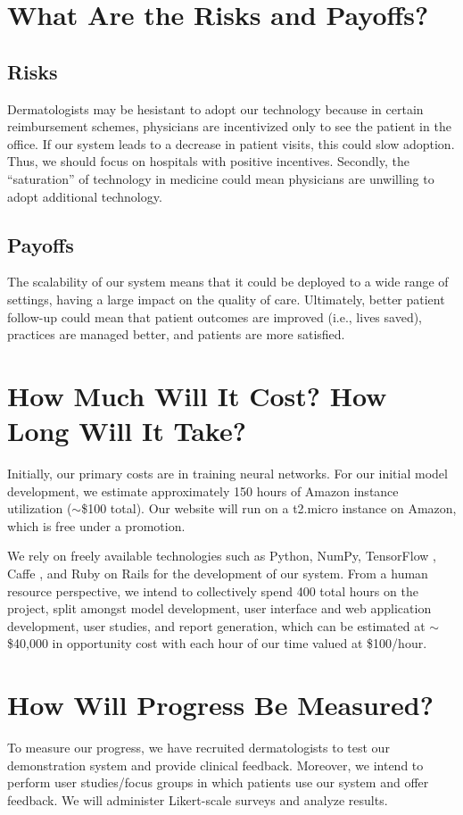 \documentclass[a4paper,12pt]{article}
\begin{document}
\section{What Are the Risks and Payoffs?}

\subsection{Risks}
Dermatologists may be hesistant to adopt our technology because in certain
reimbursement schemes, physicians are incentivized only to see the
patient in the office. If our system leads to a decrease in patient visits,
this could slow adoption. Thus, we should focus on hospitals with positive
incentives. Secondly, the ``saturation'' of technology in medicine
\cite{boonstra2014implementing} could mean physicians are unwilling to adopt
additional technology.

\subsection{Payoffs}
The scalability of our system means that it could be deployed to a wide range
of settings, having a large impact on the quality of care. Ultimately, better
patient follow-up could mean that patient outcomes are improved (i.e., lives
saved), practices are managed better, and patients are more satisfied.

\section{How Much Will It Cost? How Long Will It Take?}
Initially, our primary costs are in training neural networks. For our initial
model development, we estimate approximately 150 hours of Amazon instance
utilization ($\sim$\$100 total). Our website will run on a t2.micro instance on
Amazon, which is free under a promotion.

We rely on freely available technologies such as Python, NumPy, TensorFlow
\cite{tensorflow2015-whitepaper}, Caffe \cite{jia2014caffe}, and Ruby on Rails
for the development of our system. From a human resource perspective, we intend
to collectively spend 400 total hours on the project, split amongst model
development, user interface and web application development, user studies,
and report generation, which can be estimated at $\sim$\$40,000 in opportunity
cost with each hour of our time valued at \$100/hour.

\section{How Will Progress Be Measured?}
To measure our progress, we have recruited dermatologists to test our
demonstration system and provide clinical feedback. Moreover, we intend to
perform user studies/focus groups in which patients use our system and offer
feedback. We will administer Likert-scale surveys and analyze results.
\end{document}
